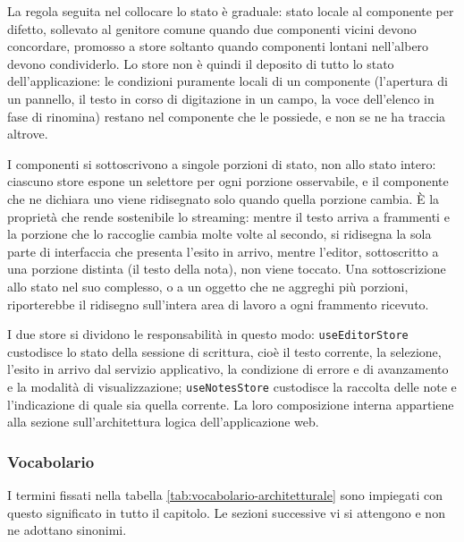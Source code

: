 \documentclass[a4paper, 10pt]{article}
\begin{document}
La regola seguita nel collocare lo stato è graduale: stato locale al componente per difetto, sollevato al genitore comune quando due componenti vicini devono concordare, promosso a store soltanto quando componenti lontani nell'albero devono condividerlo. Lo store non è quindi il deposito di tutto lo stato dell'applicazione: le condizioni puramente locali di un componente (l'apertura di un pannello, il testo in corso di digitazione in un campo, la voce dell'elenco in fase di rinomina) restano nel componente che le possiede, e non se ne ha traccia altrove.

I componenti si sottoscrivono a singole porzioni di stato, non allo stato intero: ciascuno store espone un selettore per ogni porzione osservabile, e il componente che ne dichiara uno viene ridisegnato solo quando quella porzione cambia. È la proprietà che rende sostenibile lo streaming: mentre il testo arriva a frammenti e la porzione che lo raccoglie cambia molte volte al secondo, si ridisegna la sola parte di interfaccia che presenta l'esito in arrivo, mentre l'editor, sottoscritto a una porzione distinta (il testo della nota), non viene toccato. Una sottoscrizione allo stato nel suo complesso, o a un oggetto che ne aggreghi più porzioni, riporterebbe il ridisegno sull'intera area di lavoro a ogni frammento ricevuto.

I due store si dividono le responsabilità in questo modo: \texttt{useEditorStore} custodisce lo stato della sessione di scrittura, cioè il testo corrente, la selezione, l'esito in arrivo dal servizio applicativo, la condizione di errore e di avanzamento e la modalità di visualizzazione; \texttt{useNotesStore} custodisce la raccolta delle note e l'indicazione di quale sia quella corrente. La loro composizione interna appartiene alla sezione sull'architettura logica dell'applicazione web.

\subsubsection{Vocabolario}
\label{sec:panoramica-vocabolario}
I termini fissati nella tabella \ref{tab:vocabolario-architetturale} sono impiegati con questo significato in tutto il capitolo. Le sezioni successive vi si attengono e non ne adottano sinonimi.
\end{document}
